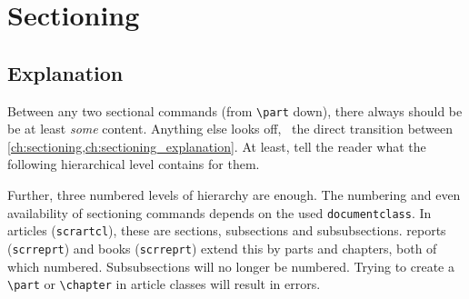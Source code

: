 \begin{table}\ContinuedFloat
\end{table}

\section{Sectioning}
\label{ch:sectioning}


\subsection{Explanation}
\label{ch:sectioning_explanation}

Between any two sectional commands (from \verb|\part| down), there always should be
be at least \emph{some} content.
Anything else looks off, \ the direct transition between
\cref{ch:sectioning,ch:sectioning_explanation}.
At least, tell the reader what the following hierarchical level contains for them.

Further, three numbered levels of hierarchy are enough.
The numbering and even availability of sectioning commands depends on the used
\verb|documentclass|.
In  articles (\verb|scrartcl|), these are sections,
subsections and subsubsections.
 reports (\verb|scrreprt|) and books (\verb|scrreprt|)
extend this by parts and chapters, both of which numbered.
Subsubsections will no longer be numbered.
Trying to create a \verb|\part| or \verb|\chapter| in article classes will result
in errors.

